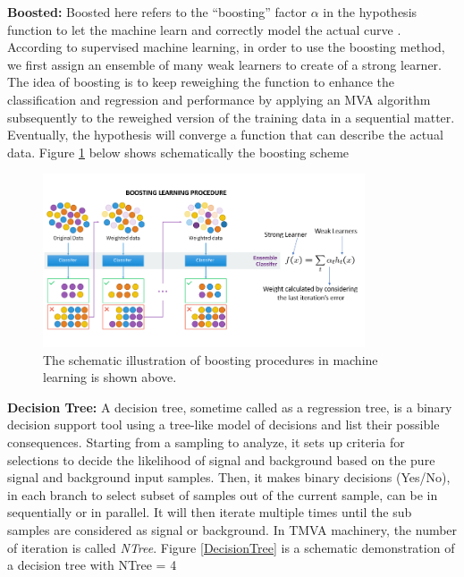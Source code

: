 \textbf{Boosted:} Boosted here refers to the ``boosting'' factor $\alpha$ in the hypothesis function to let the machine learn and correctly model the actual curve \cite{BoostingRef}. According to supervised machine learning, in order to use the boosting method, we first assign an ensemble of many weak learners to create of a strong learner. The idea of boosting is to keep reweighing the function to enhance the classification and regression and performance by applying an MVA algorithm subsequently to the reweighed version of the training data in a sequential matter. Eventually, the hypothesis will converge a function that can describe the actual data. Figure \ref{Boosting} below shows schematically the boosting scheme 


\begin{figure}[h]
\begin{center}
\includegraphics[width= 0.85\textwidth]{Figures/Chapter4/Boosting.jpg}
\caption{The schematic illustration of boosting procedures in machine learning is shown above.}
\label{Boosting}
\end{center}
\end{figure}


\textbf{Decision Tree:} A decision tree, sometime called as a regression tree, is a binary decision support tool using a tree-like model of decisions and list their possible consequences. Starting from a sampling to analyze, it sets up criteria for selections to decide the likelihood of signal and background based on the pure signal and background input samples. Then, it makes binary decisions (Yes/No), in each branch to select subset of samples out of the current sample, can be in sequentially or in parallel. It will then iterate multiple times until the sub samples are considered as signal or background. In TMVA machinery, the number of iteration is called \textit{NTree}. Figure \ref{DecisionTree} is a schematic demonstration of a decision tree with NTree = 4

